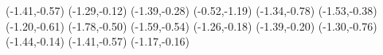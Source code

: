 \psdot[](-1.41,-0.57)
\psdot[](-1.29,-0.12)
\psdot[](-1.39,-0.28)
\psdot[](-0.52,-1.19)
\psdot[](-1.34,-0.78)
\psdot[](-1.53,-0.38)
\psdot[](-1.20,-0.61)
\psdot[](-1.78,-0.50)
\psdot[](-1.59,-0.54)
\psdot[](-1.26,-0.18)
\psdot[](-1.39,-0.20)
\psdot[](-1.30,-0.76)
\psdot[](-1.44,-0.14)
\psdot[](-1.41,-0.57)
\psdot[](-1.17,-0.16)
